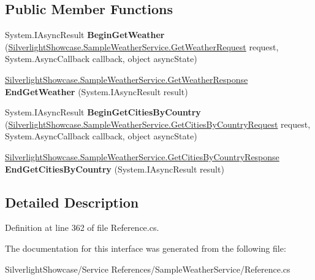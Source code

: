 \subsection*{Public Member Functions}
\begin{DoxyCompactItemize}
\item 
\hypertarget{interface_silverlight_showcase_1_1_sample_weather_service_1_1_global_weather_http_get_a276c2646c3380cffac6335301c92a9de}{
System.IAsyncResult {\bfseries BeginGetWeather} (\hyperlink{class_silverlight_showcase_1_1_sample_weather_service_1_1_get_weather_request}{SilverlightShowcase.SampleWeatherService.GetWeatherRequest} request, System.AsyncCallback callback, object asyncState)}
\label{interface_silverlight_showcase_1_1_sample_weather_service_1_1_global_weather_http_get_a276c2646c3380cffac6335301c92a9de}

\item 
\hypertarget{interface_silverlight_showcase_1_1_sample_weather_service_1_1_global_weather_http_get_ae98c566c6153a9810da3e035d8b2cc40}{
\hyperlink{class_silverlight_showcase_1_1_sample_weather_service_1_1_get_weather_response}{SilverlightShowcase.SampleWeatherService.GetWeatherResponse} {\bfseries EndGetWeather} (System.IAsyncResult result)}
\label{interface_silverlight_showcase_1_1_sample_weather_service_1_1_global_weather_http_get_ae98c566c6153a9810da3e035d8b2cc40}

\item 
\hypertarget{interface_silverlight_showcase_1_1_sample_weather_service_1_1_global_weather_http_get_a21cb2b5cd8521b07a304148a0c95adaf}{
System.IAsyncResult {\bfseries BeginGetCitiesByCountry} (\hyperlink{class_silverlight_showcase_1_1_sample_weather_service_1_1_get_cities_by_country_request}{SilverlightShowcase.SampleWeatherService.GetCitiesByCountryRequest} request, System.AsyncCallback callback, object asyncState)}
\label{interface_silverlight_showcase_1_1_sample_weather_service_1_1_global_weather_http_get_a21cb2b5cd8521b07a304148a0c95adaf}

\item 
\hypertarget{interface_silverlight_showcase_1_1_sample_weather_service_1_1_global_weather_http_get_a520cd65e7bbb435391c258038b55887b}{
\hyperlink{class_silverlight_showcase_1_1_sample_weather_service_1_1_get_cities_by_country_response}{SilverlightShowcase.SampleWeatherService.GetCitiesByCountryResponse} {\bfseries EndGetCitiesByCountry} (System.IAsyncResult result)}
\label{interface_silverlight_showcase_1_1_sample_weather_service_1_1_global_weather_http_get_a520cd65e7bbb435391c258038b55887b}

\end{DoxyCompactItemize}


\subsection{Detailed Description}


Definition at line 362 of file Reference.cs.

The documentation for this interface was generated from the following file:\begin{DoxyCompactItemize}
\item 
SilverlightShowcase/Service References/SampleWeatherService/Reference.cs\end{DoxyCompactItemize}
